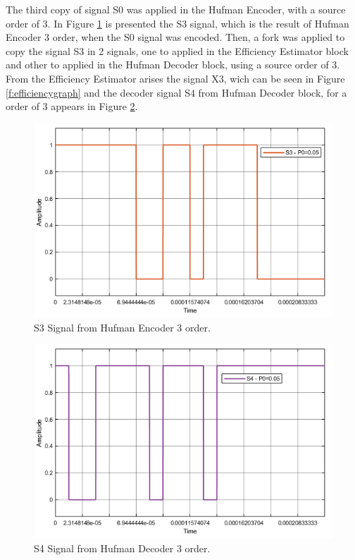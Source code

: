 \begin{refsection}
The third copy of signal S0 was applied in the Hufman Encoder, with a source order of 3. In Figure \ref{f:S3} is presented the S3 signal, which is the result of Hufman Encoder 3 order, when the S0 signal was encoded.
Then, a fork was applied to copy the signal S3 in 2 signals, one to applied in the Efficiency Estimator block and other to applied in the Hufman Decoder block, using a source order of 3.
From the Efficiency Estimator arises the signal X3, wich can be seen in Figure \ref{f:efficiencygraph} and the decoder signal S4 from Hufman Decoder block, for a order of 3 appears in Figure \ref{f:S4}. 

\begin{figure}[!h]
\centering
\includegraphics[width=5in]{./sdf/eit_45550_estimator_source_code_efficiency/figures/S3.png}
\caption[S3 Signal from Hufman Encoder 3 order.]{S3 Signal from Hufman Encoder 3 order.}
\label{f:S3}
\end{figure}


\begin{figure}[!h]
\centering
\includegraphics[width=5in]{./sdf/eit_45550_estimator_source_code_efficiency/figures/S4.png}
\caption[S4 Signal from Hufman Decoder 3 order.]{S4 Signal from Hufman Decoder 3 order.}
\label{f:S4}
\end{figure}


\end{refsection}
